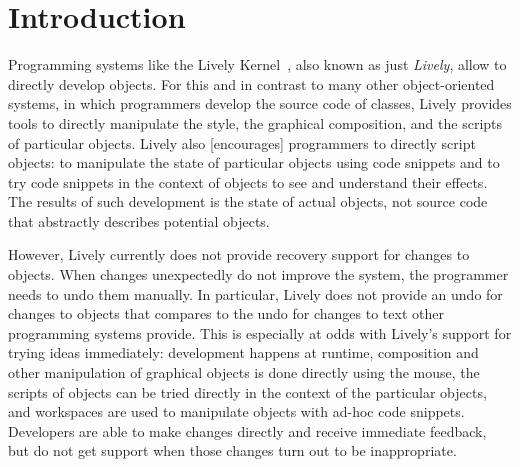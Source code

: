 
\chapter{Introduction} \label{chapter:INTRODUCTION}

Programming systems like the Lively Kernel~\cite{Ingalls2008LKS,Krahn2009LWD}, also known as just \emph{Lively}, allow to directly develop objects.
For this and in contrast to many other object-oriented systems, in which programmers develop the source code of classes, Lively provides tools to directly manipulate the style, the graphical composition, and the scripts of particular objects.
Lively also [encourages] programmers to directly script objects: to manipulate the state of particular objects using code snippets and to try code snippets in the context of objects to see and understand their effects.
The results of such development is the state of actual objects, not source code that abstractly describes potential objects.

However, Lively currently does not provide recovery support for changes to objects.
When changes unexpectedly do not improve the system, the programmer needs to undo them manually.
In particular, Lively does not provide an undo for changes to objects that compares to the undo for changes to text other programming systems provide.
This is especially at odds with Lively's support for trying ideas immediately: development happens at runtime, composition and other manipulation of graphical objects is done directly using the mouse, the scripts of objects can be tried directly in the context of the particular objects, and workspaces are used to manipulate objects with ad-hoc code snippets.
Developers are able to make changes directly and receive immediate feedback, but do not get support when those changes turn out to be inappropriate.

